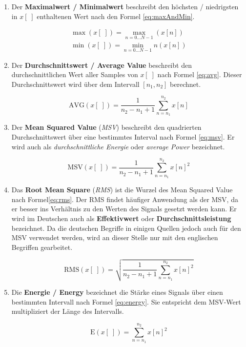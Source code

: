 \begin{enumerate}[leftmargin=*]
	
\item Der \textbf{Maximalwert / Minimalwert} beschreibt den höchsten / niedrigsten in  $x[\;]$ enthaltenen Wert nach den Formel \ref{eq:maxAndMin}.

\begin{equation}
\begin{gathered}
 \max(x[\;]) = \max\limits_{n=0\ldots N-1}(x[n]) \\ 
 \min(x[\;])= \min\limits_{n=0\ldots N-1}{n}(x[n])
\end{gathered}
\label{eq:maxAndMin}
\end{equation}

	
\item Der \textbf{Durchschnittswert / Average Value} beschreibt den durchschnittlichen Wert aller Samples von $x[\;]$ nach Formel \ref{eq:avg}. Dieser Durchschnittswert wird über dem Intervall $[n_1, n_2]$  berechnet.

\begin{equation}
\text{AVG}(x[\;]) = \frac{1}{n_2 - n_1 + 1} \sum_{n = n_1}^{n_2} x[n]
\label{eq:avg}
\end{equation}

\item Der \textbf{Mean Squared Value} (\emph{MSV}) beschreibt den quadrierten Durchschnittswert über eine bestimmtes Interval nach Formel \ref{eq:msv}. Er wird auch als \emph{durchschnittliche Energie} oder \emph{average Power} bezeichnet.

\begin{equation}
\text{MSV}(x[\;]) = \frac{1}{n_2 - n_1 + 1} \sum_{n = n_1}^{n_2} x[n]^2
\label{eq:msv}
\end{equation}

\item Das \textbf{Root Mean Square} (\emph{RMS}) ist die Wurzel des Mean Squared Value nach Formel\ref{eq:rms}. Der RMS findet häufiger Anwendung als der MSV, da er besser ins Verhältnis zu den Werten des Signals gesetzt werden kann. Er wird im Deutschen auch als \textbf{Effektivwert} oder \textbf{Durchschnittsleistung} bezeichnet. Da die deutschen Begriffe in einigen Quellen jedoch auch für den MSV verwendet werden, wird an dieser Stelle nur mit den englischen Begriffen gearbeitet.

\begin{equation}
\text{RMS}(x[\;]) = \sqrt{\frac{1}{n_2 - n_1 + 1} \sum_{n = n_1}^{n_2} x[n]^2}
\label{eq:rms}
\end{equation}

\item Die \textbf{Energie / Energy} bezeichnet die \glqq Stärke \grqq{} eines Signals über einen bestimmten Intervall nach Formel \ref{eq:energy}. Sie entspricht dem MSV-Wert multipliziert der Länge des Intervalls. \cite[S. 27-28]{dspMichigan}

\begin{equation}
\text{E}(x[\;]) = \sum_{n = n_1}^{n_2} x[n]^2
\label{eq:energy}
\end{equation}
	
\end{enumerate}	

